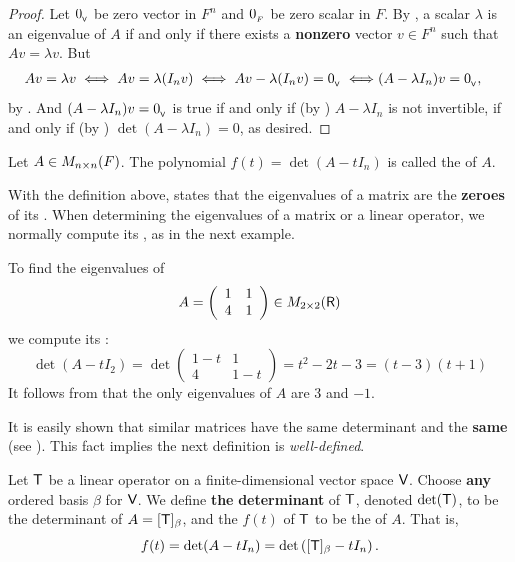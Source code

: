\begin{proof}
Let \(0_{_{\textsf{V}}}\) be zero vector in \(F^n\) and \(0_{_F}\) be zero scalar in \(F\).
By , a scalar \(\lambda\) is an eigenvalue of \(A\) if and only if there exists a \textbf{nonzero} vector \(v \in F^n\) such that \(Av = \lambda v\).
But
\begin{align*}
    Av = \lambda v \iff Av = \lambda (I_n v) \iff Av - \lambda (I_n v) = 0_{_{\textsf{V}}} \iff & (A - \lambda I_n) v = 0_{_{\textsf{V}}},
\end{align*}
by .
And \((A - \lambda I_n) v = 0_{_{\textsf{V}}}\) is true if and only if (by ) \(A - \lambda I_n\) is not invertible,
if and only if (by ) \(\det(A - \lambda I_n) = 0\), as desired.
\end{proof}

\begin{definition} \label{def 5.3}
Let \(A \in M_{n \times n}(F)\).
The polynomial \(f(t) = \det(A - t I_n)\) is called the \textbf{\CPOLY{}} of \(A\).
\end{definition}

With the definition above,  states that the eigenvalues of a matrix are the \textbf{zeroes} of its \CPOLY{}.
When determining the eigenvalues of a matrix or a linear operator, we normally compute its \CPOLY{}, as in the next example.

\begin{example} \label{example 5.1.4}
To find the eigenvalues of
\[
    A = \left(\begin{array}{ll} 1 & 1 \\ 4 & 1 \end{array}\right) \in M_{2 \times 2}(\textsf{R})
\]
we compute its \CPOLY{}:
\[
    \det\left(A - tI_2\right) = \det\left(\begin{array}{cc} 1-t & 1 \\ 4 & 1-t \end{array}\right)
    = t^{2} - 2 t - 3 = (t-3)(t+1)
\]
It follows from  that the only eigenvalues of \(A\) are \(3\) and \(-1\).
\end{example}

\begin{remark} \label{remark 5.1.6}
It is easily shown that similar matrices have the same determinant and the \textbf{same \CPOLY{}} (see ).
This fact implies the next definition is \emph{well-defined}.
\end{remark}

\begin{definition} \label{def 5.4}
Let \(\textsf{T}\) be a linear operator on a finite-dimensional vector space \(\textsf{V}\).
Choose \textbf{any} ordered basis \(\beta\) for \(\textsf{V}\).
We define \textbf{the} \textbf{determinant} of \(\textsf{T}\), denoted \(\det(\textsf{T})\), to be the determinant of \(A = [\textsf{T}]_{\beta}\),
and the \textbf{\CPOLY{}} \(f(t)\) of \(\textsf{T}\) to be the \CPOLY{} of \(A\).
That is,
\[
    f(t) = \det(A - t I_n) = \det \left( [\textsf{T}]_{\beta} - t I_n \right).
\]
\end{definition}

